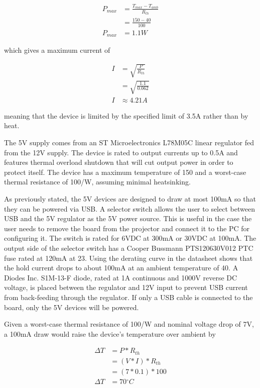 \documentclass{article}
\newcommand{\degree}{\ensuremath{^{\circ}}}
\begin{document}
\begin{align*}
    P_{max} &= \frac{T_{max}-T_{amb}}{R_{th}} \\
    &= \frac{150 - 40}{100} \\
    P_{max} &= 1.1W
\end{align*}

which gives a maximum current of

\begin{align*}
    I &= \sqrt{\frac{P}{R_{th}}} \\
    &= \sqrt{\frac{1.1}{0.062}} \\
    I &\approx 4.21A
\end{align*}

meaning that the device is limited by the specified limit of 3.5A rather than by heat.

The 5V supply comes from an ST Microelectronics L78M05C linear regulator fed from the 12V supply.
The device is rated to output currents up to 0.5A and features thermal overload shutdown that will
cut output power in order to protect itself.  The device has a maximum temperature of
150\textcelsius{} and a worst-case thermal resistance of 100\textcelsius{}/W, assuming minimal
heatsinking.

As previously stated, the 5V devices are designed to draw at most 100mA so that they can be powered
via USB.  A selector switch allows the user to select between USB and the 5V regulator as the 5V
power source.  This is useful in the case the user needs to remove the board from the projector and
connect it to the PC for configuring it.  The switch is rated for 6VDC at 300mA or 30VDC at 100mA.
The output side of the selector switch has a Cooper Bussmann PTS120630V012 PTC fuse rated at 120mA
at 23\textcelsius{}.  Using the derating curve in the datasheet shows that the hold current drops to
about 100mA at an ambient temperature of 40\textcelsius{}.  A Diodes Inc. S1M-13-F diode, rated at
1A continuous and 1000V reverse DC voltage, is placed between the regulator and 12V input to prevent
USB current from back-feeding through the regulator.  If only a USB cable is connected to the board,
only the 5V devices will be powered.

Given a worst-case thermal resistance of 100\textcelsius{}/W and nominal voltage drop of 7V, a 100mA
draw would raise the device's temperature over ambient by

\begin{align*}
    \Delta T &= P * R_{th} \\
    &= (V*I) * R_{th} \\
    &= (7 * 0.1) * 100 \\
    \Delta T &= 70\degree C
\end{align*}
\end{document}
